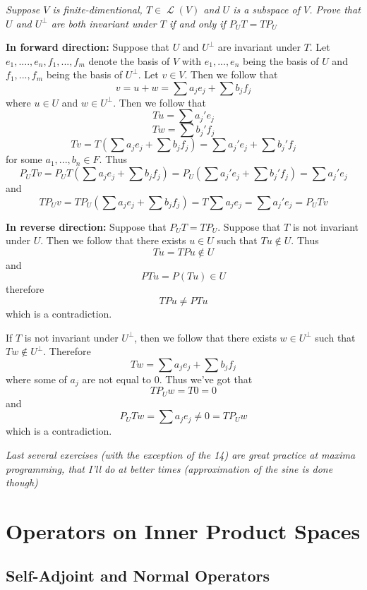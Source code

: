 \documentclass[11pt,oneside,titlepage]{book}
\DeclareMathOperator \map {\mathcal {L}}
\begin{document}
\subsection{}

\textit{Suppose $V$ is finite-dimentional, $T \in \map(V)$ and $U$ is a subspace of $V$. Prove
  that $U$ and $U^\perp$ are both invariant under $T$ if and only if $P_U T = T P_U$}

\textbf{In forward direction: }
Suppose that $U$ and $U^\perp$ are invariant under $T$. Let $e_1, ...., e_n, f_1, ..., f_m$
denote the basis of $V$ with $e_1, ..., e_n$ being the basis of $U$ and $f_1, ..., f_m$
being the basis of $U^\perp$. Let $v \in V$. Then we follow that
$$v = u + w  = \sum{a_j e_j} + \sum{b_j f_j}$$
where $u \in U$ and $w \in U^\perp$.
Then we follow that
$$Tu = \sum{a_j' e_j}$$
$$Tw = \sum{b_j' f_j}$$
$$T v = T (\sum{a_j e_j} + \sum{b_j f_j}) = \sum{a_j' e_j} + \sum{b_j' f_j}$$
for some $a_1, ..., b_n \in F$.
Thus
$$P_U T v = P_U T( \sum{a_j e_j} + \sum{b_j f_j}) =
P_U (\sum{a_j' e_j} + \sum{b_j' f_j}) = \sum{a_j' e_j}$$
and
$$ T P_U v =  T P_U ( \sum{a_j e_j} + \sum{b_j f_j}) =
T \sum{a_j e_j}  = \sum{a_j' e_j} = P_U T v$$

\textbf{In reverse direction: }
Suppose that $P_U T = T P_U$. Suppose that $T$ is not invariant under $U$. Then we follow that
there exists $u \in U$ such that $Tu \notin U$. Thus
$$T u = T P u \notin U$$
and
$$P T u = P(Tu) \in U$$
therefore
$$TPu \neq PTu$$
which is a contradiction.

If $T$ is not invariant under $U^\perp$, then we follow that there exists $w \in U^\perp$ such
that $Tw \notin U^\perp$. Therefore
$$Tw = \sum{a_j e_j} + \sum{b_j f_j}$$
where some of $a_j$ are not equal to $0$. Thus we've got that 
$$T P_U w = T 0 = 0$$
and
$$P_U T w  = \sum{a_j e_j} \neq 0 = T P_U w$$
which is a contradiction.

\textit{Last several exercises (with the exception of the 14)
  are great practice at maxima programming, that I'll do at better times (approximation of
  the sine is done though)}

\chapter{Operators on Inner Product Spaces}

\section{Self-Adjoint and Normal Operators}
\end{document}
